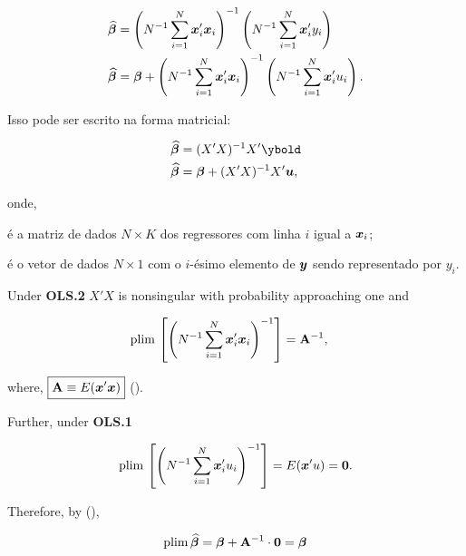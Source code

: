 \documentclass[11pt, oneside, a4paper, article]{article}
\numberwithin{equation}{section}
\begin{document}
\vspace{-1 em}
\begin{align*}
\widehat{\boldsymbol{\beta}} &=
\left( N^{-1} \sum_{i=1}^{N} \boldsymbol{x}_{i}' \boldsymbol{x}_{i} \right)^{-1} 
\left( N^{-1} \sum_{i=1}^{N} \boldsymbol{x}_{i}' y_{i} \right)
\\
\widehat{\boldsymbol{\beta}} &=
\boldsymbol{\beta} +
\left( N^{-1} \sum_{i=1}^{N} \boldsymbol{x}_{i}' \boldsymbol{x}_{i} \right)^{-1} 
\left( N^{-1} \sum_{i=1}^{N} \boldsymbol{x}_{i}' u_{i} \right).
\end{align*}

\noindent
Isso pode ser escrito na forma matricial:

\vspace{-1 em}
\begin{align*}
\betahatbold &=	(X'X)^{-1} X'\ybold
\\
\betahatbold &=	\betavec + (X'X)^{-1} X'\ubold ,
\end{align*}

\noindent onde,

\vspace{-1 ex}
\begin{description}[noitemsep]
\item[$X$] é a matriz de dados $N \times K$ dos regressores com linha $i$ igual a $\boldsymbol{x}_{i}$;

\item[$\ybold$] é o vetor de dados $N \times 1$ com o $i$-ésimo elemento de $\boldsymbol{y}$ sendo representado por $y_{i}$.
\end{description}

Under \textbf{OLS.2} $X'X$ is nonsingular with probability approaching one and

\begin{align*}
\text{plim} \, \left[ \left( N^{-1} \sum_{i=1}^{N} \boldsymbol{x}_{i}' \boldsymbol{x}_{i} \right)^{-1} \right] 
&= \mathbf{A}^{-1},
\end{align*}

\noindent where,
$\boxed{\mathbf{A} \equiv E(\boldsymbol{x}' \boldsymbol{x})}$ ().

Further, under \textbf{OLS.1}

\begin{align*}
\text{plim} \, \left[ \left( N^{-1} \sum_{i=1}^{N} \boldsymbol{x}_{i}' u_{i} \right)^{-1} \right]
= E(\boldsymbol{x}'u) = \boldsymbol{0}.
\end{align*}

Therefore, by  (), 

\begin{align*}
	\text{plim} \, \widehat{\boldsymbol{\beta}} = \boldsymbol{\beta} + \mathbf{A}^{-1} \cdot \boldsymbol{0} = \boldsymbol{\beta}
\end{align*}
\end{document}
